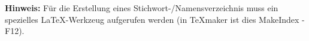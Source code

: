 
\textbf{Hinweis:} Für die Erstellung eines Stichwort-/Namensverzeichnis muss ein spezielles \LaTeX-Werkzeug aufgerufen werden (in TeXmaker ist dies MakeIndex - F12). 
